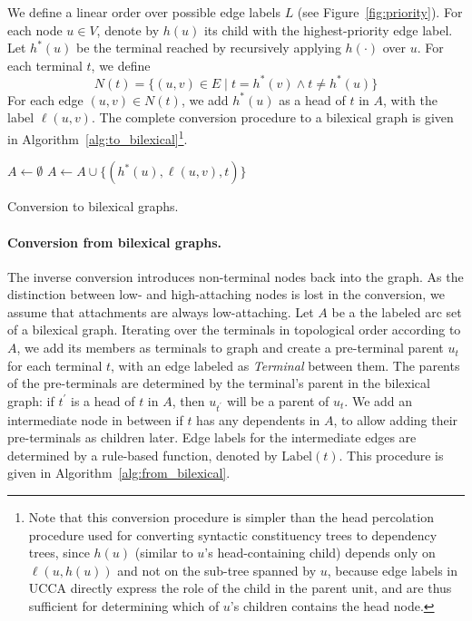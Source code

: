 \documentclass[11pt,a4paper]{article}
\newcommand{\figref}[1]{Figure~\ref{#1}}
\begin{document}
We define a linear order over possible edge labels $L$ (see \figref{fig:priority}).
For each node $u \in V$, denote by $h(u)$ its child with the highest-priority edge label.
Let $h^*(u)$ be the terminal reached by recursively applying $h(\cdot)$ over $u$.
For each terminal $t$, we define
\[
N(t) = \{(u,v)\in E \;|\; t=h^*(v) \wedge t \neq h^*(u) \}
\]
For each edge $(u,v)\in N(t)$, we add $h^*(u)$ as a head of $t$ in $A$,
with the label $\ell(u,v)$.
The complete conversion procedure to a bilexical graph is given in
Algorithm~\ref{alg:to_bilexical}\footnote{Note that this conversion procedure
is simpler than the head percolation procedure used for converting syntactic constituency
trees to dependency trees,
since $h(u)$ (similar to $u$'s head-containing child)
depends only on $\ell(u,h(u))$ and not on the sub-tree spanned by $u$,
because edge labels in UCCA directly express the role of the child in the parent unit, and
are thus sufficient for determining which of $u$'s children contains the head node.}.

\begin{algorithm}[ht]
 $A \leftarrow \emptyset$\;
  {
   {
   $A \leftarrow A \cup \{(h^*(u), \ell(u, v), t)\}$\;
  }
 }
 \caption{Conversion to bilexical graphs.}
 \label{alg:to_bilexical}
\end{algorithm}

\paragraph{Conversion from bilexical graphs.}
The inverse conversion introduces non-terminal nodes back into the graph.
As the distinction between low- and high-attaching nodes is lost in the
conversion, we assume that attachments are always
low-attaching.
Let $A$ be a the labeled arc set of a bilexical graph.
Iterating over the terminals in topological order according to $A$,
we add its members as terminals to graph
and create a pre-terminal parent $u_t$ for each terminal $t$,
with an edge labeled as \textit{Terminal} between them.
The parents of the pre-terminals are determined by the terminal's parent in the bilexical
graph: if $t^\prime$ is a head of $t$ in $A$, then $u_{t^\prime}$ will be a parent of $u_t$.
We add an intermediate node in between if $t$ has any dependents in $A$,
to allow adding their pre-terminals as children later.
Edge labels for the intermediate edges are determined by a rule-based function, denoted by
$\mathrm{Label}(t)$.
This procedure is given in Algorithm~\ref{alg:from_bilexical}.
\end{document}
